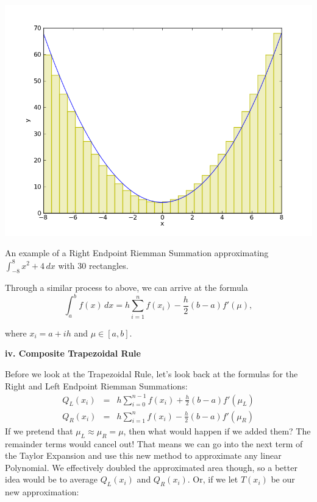 \documentclass[12pt]{article}
\newcommand{\newLine}{\vspace{5mm}}
\newcommand{\nextsubsection}[1]{\newLine \noindent \large \textbf{#1} \normalsize}
\newcommand{\integral}[3]{\text{$\int^{#2}_{#1} #3\,dx$}}
\newcommand{\summation}[3]{\text{$\sum^{#2}_{#1} #3$}}
\begin{document}
\begin{center} \includegraphics[scale = 0.5]{parabolaRightRIemman.png} 

\small An example of a Right Endpoint Riemman Summation approximating $\integral{-8}{8}{x^2+4}$ with 30 rectangles.\normalsize
\end{center}

Through a similar process to above, we can arrive at the formula
\begin{equation*} 
\integral{a}{b}{f(x)} = h\summation{i = 1}{n}{f(x_i)} - \frac{h}{2}(b-a)f'(\mu),
\end{equation*}

where $x_i = a + ih$ and $\mu\in[a,b]$.

\nextsubsection{iv. Composite Trapezoidal Rule}

\newLine Before we look at the Trapezoidal Rule, let's look back at the formulas for the Right and Left Endpoint Riemman Summations:
\begin{eqnarray*} Q_L(x_i) &=& h\summation{i = 0}{n - 1}{f(x_i)} + \frac{h}{2}(b-a)f'(\mu_L) \\
Q_R(x_i) &=& h\summation{i = 1}{n}{f(x_i)} - \frac{h}{2}(b-a)f'(\mu_R)
\end{eqnarray*}
If we pretend that $\mu_L \approx \mu_R = \mu$, then what would happen if we added them? The remainder terms would cancel out! That means we can go into the next term of the Taylor Expansion and use this new method to approximate any linear Polynomial. We effectively doubled the approximated area though, so a better idea would be to average $Q_L(x_i)$ and $Q_R(x_i)$. Or, if we let $T(x_i)$ be our new approximation:
\end{document}
